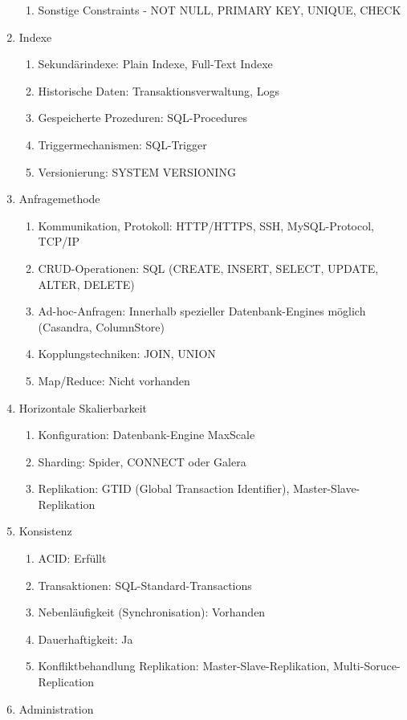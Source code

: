 \begin{enumerate}
\begin{enumerate}
		\item Sonstige Constraints - NOT NULL, PRIMARY KEY, UNIQUE, CHECK
	\end{enumerate}
	\item Indexe
	\begin{enumerate}
		\item Sekundärindexe: Plain Indexe, Full-Text Indexe
		\item Historische Daten: Transaktionsverwaltung, Logs
		\item Gespeicherte Prozeduren: SQL-Procedures
		\item Triggermechanismen: SQL-Trigger
		\item Versionierung: SYSTEM VERSIONING
	\end{enumerate}
	\item Anfragemethode
	\begin{enumerate}
		\item Kommunikation, Protokoll: HTTP/HTTPS, SSH, MySQL-Protocol, TCP/IP
		\item CRUD-Operationen: SQL (CREATE, INSERT, SELECT, UPDATE, ALTER, DELETE)
		\item Ad-hoc-Anfragen: Innerhalb spezieller Datenbank-Engines möglich (Casandra, ColumnStore)
		\item Kopplungstechniken: JOIN, UNION
		\item Map/Reduce: Nicht vorhanden
	\end{enumerate}
	\item Horizontale Skalierbarkeit
	\begin{enumerate}
		\item Konfiguration: Datenbank-Engine MaxScale
		\item Sharding: Spider, CONNECT oder Galera
		\item Replikation: GTID (Global Transaction Identifier), Master-Slave-Replikation
	\end{enumerate}
	\item Konsistenz
	\begin{enumerate}
		\item ACID: Erfüllt
		\item Transaktionen: SQL-Standard-Transactions
		\item Nebenläufigkeit (Synchronisation): Vorhanden
		\item Dauerhaftigkeit: Ja
		\item Konfliktbehandlung Replikation: Master-Slave-Replikation, Multi-Soruce-Replication
	\end{enumerate}
	\item Administration

\end{enumerate}

